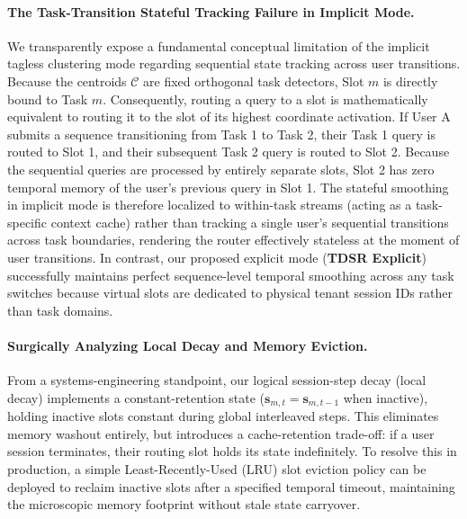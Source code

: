 \paragraph{The Task-Transition Stateful Tracking Failure in Implicit Mode.}
We transparently expose a fundamental conceptual limitation of the implicit tagless clustering mode regarding sequential state tracking across user transitions. Because the centroids $\mathcal{C}$ are fixed orthogonal task detectors, Slot $m$ is directly bound to Task $m$. Consequently, routing a query to a slot is mathematically equivalent to routing it to the slot of its highest coordinate activation. If User A submits a sequence transitioning from Task 1 to Task 2, their Task 1 query is routed to Slot 1, and their subsequent Task 2 query is routed to Slot 2. Because the sequential queries are processed by entirely separate slots, Slot 2 has zero temporal memory of the user's previous query in Slot 1. The stateful smoothing in implicit mode is therefore localized to within-task streams (acting as a task-specific context cache) rather than tracking a single user's sequential transitions across task boundaries, rendering the router effectively stateless at the moment of user transitions. In contrast, our proposed explicit mode (\textbf{TDSR Explicit}) successfully maintains perfect sequence-level temporal smoothing across any task switches because virtual slots are dedicated to physical tenant session IDs rather than task domains.

\paragraph{Surgically Analyzing Local Decay and Memory Eviction.}
From a systems-engineering standpoint, our logical session-step decay (local decay) implements a constant-retention state ($\mathbf{s}_{m, t} = \mathbf{s}_{m, t-1}$ when inactive), holding inactive slots constant during global interleaved steps. This eliminates memory washout entirely, but introduces a cache-retention trade-off: if a user session terminates, their routing slot holds its state indefinitely. To resolve this in production, a simple Least-Recently-Used (LRU) slot eviction policy can be deployed to reclaim inactive slots after a specified temporal timeout, maintaining the microscopic memory footprint without stale state carryover.

